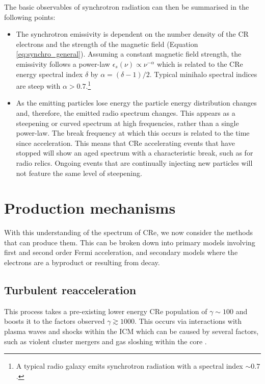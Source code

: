 The basic observables of synchrotron radiation can then be summarised in the following points:
\begin{itemize}
    \item The synchrotron emissivity is dependent on the number density of the CR electrons and the strength of the magnetic field (Equation \ref{eq:synchro_general}). Assuming a constant magnetic field strength, the emissivity follows a power-law $\epsilon_s(\nu) \propto \nu^{-\alpha}$ which is related to the CRe energy spectral index $\delta$ by $\alpha = (\delta - 1)/2$. Typical minihalo spectral indices are steep with $\alpha > 0.7$.\footnote{A typical radio galaxy emits synchrotron radiation with a spectral index $\sim0.7$.}
    \item As the emitting particles lose energy the particle energy distribution changes and, therefore, the emitted radio spectrum changes. This appears as a steepening or curved spectrum at high frequencies, rather than a single power-law. The break frequency at which this occurs is related to the time since acceleration. This means that CRe accelerating events that have stopped will show an aged spectrum with a characteristic break, such as for radio relics. Ongoing events that are continually injecting new particles will not feature the same level of steepening. 
\end{itemize} 

\section{Production mechanisms}
\label{sec:BG_production}
With this understanding of the spectrum of CRe, we now consider the methods that can produce them. This can be broken down into primary models involving first and second order Fermi acceleration, and secondary models where the electrons are a byproduct or resulting from decay.

\subsection{Turbulent reacceleration}
\label{sec:BG_reacceleration}

This process takes a pre-existing lower energy CRe population of $\gamma\sim100$ and boosts it to the factors observed $\gamma\gtrsim1000$. This occurs via interactions with plasma waves and shocks within the ICM which can be caused by several factors, such as violent cluster mergers and gas sloshing within the core \citep{Brunetti2001, Fujita2004, Mazotta2008}. 

